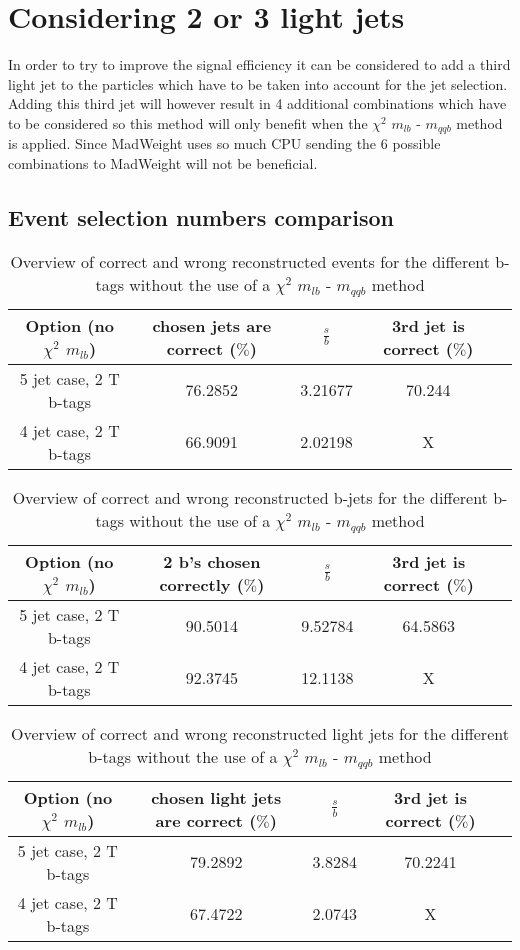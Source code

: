 \newpage
\section{Considering 2 or 3 light jets}
In order to try to improve the signal efficiency it can be considered to add a third light jet to the particles which have to be taken into account for the jet selection. Adding this third jet will however result in 4 additional combinations which have to be considered so this method will only benefit when the $\chi^{2}$ $m_{lb}$ - $m_{qqb}$ method is applied. Since MadWeight uses so much CPU sending the $6$ possible combinations to MadWeight will not be beneficial.
\subsection{Event selection numbers comparison}
 \begin{table}[!h] 
 \begin{tabular}{c|c|c|c|c} 
\textbf{Option} (no $\chi^{2}$ $m_{lb}$) & chosen jets are correct ($\%$)       & $\frac{s}{b}$ & 3rd jet is correct ($\%$) \\ \hline 
 5 jet case, 2 T b-tags              & 76.2852 & 3.21677 & 70.244\\ 
 4 jet case, 2 T b-tags              & 66.9091 & 2.02198 & X \\ 
 \end{tabular} 
\caption{Overview of correct and wrong reconstructed events for the different b-tags without the use of a $\chi^{2}$ $m_{lb}$ - $m_{qqb}$ method} 
 \end{table} 
 
 \begin{table}[!h] 
 \begin{tabular}{c|c|c|c|c} 
\textbf{Option} (no $\chi^{2}$ $m_{lb}$) & 2 b's chosen correctly ($\%$)        & $\frac{s}{b}$ & 3rd jet is correct ($\%$) \\ \hline 
 5 jet case, 2 T b-tags              & 90.5014 & 9.52784 & 64.5863\\ 
 4 jet case, 2 T b-tags              & 92.3745 & 12.1138 & X \\ 
 \end{tabular} 
\caption{Overview of correct and wrong reconstructed b-jets for the different b-tags without the use of a $\chi^{2}$ $m_{lb}$ - $m_{qqb}$ method} 
 \end{table} 
 
 \begin{table}[!h] 
 \begin{tabular}{c|c|c|c|c} 
\textbf{Option} (no $\chi^{2}$ $m_{lb}$) & chosen light jets are correct ($\%$) & $\frac{s}{b}$ & 3rd jet is correct ($\%$) \\ \hline 
 5 jet case, 2 T b-tags              & 79.2892 & 3.8284 & 70.2241\\ 
 4 jet case, 2 T b-tags              & 67.4722 & 2.0743 & X \\ 
 \end{tabular} 
\caption{Overview of correct and wrong reconstructed light jets for the different b-tags without the use of a $\chi^{2}$ $m_{lb}$ - $m_{qqb}$ method} 
 \end{table} 

